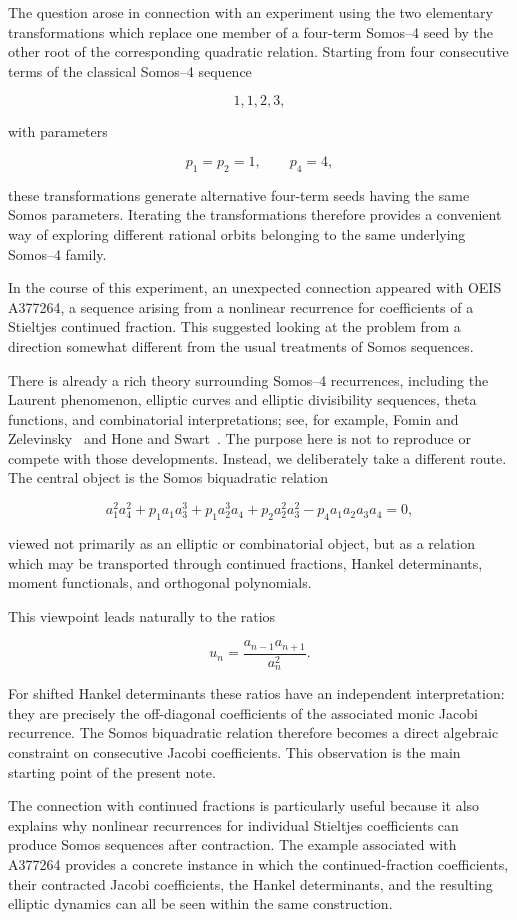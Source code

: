\documentclass[11pt]{article}
\theoremstyle{remark}
\begin{document}
The question arose in connection with an experiment using the two elementary transformations which replace one member of a four-term Somos--4 seed by the other root of the corresponding quadratic relation. Starting from four consecutive terms of the classical Somos--4 sequence

$$
1,1,2,3,
$$

with parameters

$$
p_1=p_2=1,\qquad p_4=4,
$$

these transformations generate alternative four-term seeds having the same Somos parameters. Iterating the transformations therefore provides a convenient way of exploring different rational orbits belonging to the same underlying Somos--4 family.

In the course of this experiment, an unexpected connection appeared with OEIS A377264, a sequence arising from a nonlinear recurrence for coefficients of a Stieltjes continued fraction. This suggested looking at the problem from a direction somewhat different from the usual treatments of Somos sequences.

There is already a rich theory surrounding Somos--4 recurrences, including the Laurent phenomenon, elliptic curves and elliptic divisibility sequences, theta functions, and combinatorial interpretations; see, for example, Fomin and Zelevinsky~\cite{FominZelevinsky2002} and Hone and Swart~\cite{HoneSwart2008}. The purpose here is not to reproduce or compete with those developments. Instead, we deliberately take a different route. The central object is the Somos biquadratic relation

$$
a_1^2a_4^2
+p_1a_1a_3^3
+p_1a_2^3a_4
+p_2a_2^2a_3^2
-p_4a_1a_2a_3a_4=0,
$$

viewed not primarily as an elliptic or combinatorial object, but as a relation which may be transported through continued fractions, Hankel determinants, moment functionals, and orthogonal polynomials.

This viewpoint leads naturally to the ratios

$$
u_n=\frac{a_{n-1}a_{n+1}}{a_n^2}.
$$

For shifted Hankel determinants these ratios have an independent interpretation: they are precisely the off-diagonal coefficients of the associated monic Jacobi recurrence. The Somos biquadratic relation therefore becomes a direct algebraic constraint on consecutive Jacobi coefficients. This observation is the main starting point of the present note.

The connection with continued fractions is particularly useful because it also explains why nonlinear recurrences for individual Stieltjes coefficients can produce Somos sequences after contraction. The example associated with A377264 provides a concrete instance in which the continued-fraction coefficients, their contracted Jacobi coefficients, the Hankel determinants, and the resulting elliptic dynamics can all be seen within the same construction.
\end{document}

